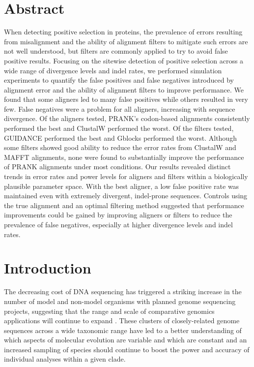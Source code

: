 \documentclass{article}
\begin{document}
\section*{Abstract}
When detecting positive selection in proteins, the prevalence of
errors resulting from misalignment and the ability of alignment
filters to mitigate such errors are not well understood, but filters
are commonly applied to try to avoid false positive results.
% 
Focusing on the sitewise detection of positive selection across a wide
range of divergence levels and indel rates, we performed simulation
experiments to quantify the false positives and false negatives
introduced by alignment error and the ability of alignment filters to
improve performance.
%
We found that some aligners led to many false positives while others
resulted in very few.  False negatives were a problem for all
aligners, increasing with sequence divergence. Of the aligners tested, PRANK's
codon-based alignments consistently performed the best and ClustalW
performed the worst.
%
Of the filters tested, GUIDANCE performed the best and Gblocks
performed the worst. Although some filters showed good ability to
reduce the error rates from ClustalW and MAFFT alignments, none were
found to substantially improve the performance of PRANK alignments
under most conditions.
%
Our results revealed distinct trends in error rates and power levels
for aligners and filters within a biologically plausible parameter
space. With the best aligner, a low false positive rate was maintained
even with extremely divergent, indel-prone sequences. Controls using
the true alignment and an optimal filtering method suggested that
performance improvements could be gained by improving aligners or
filters to reduce the prevalence of false negatives, especially at
higher divergence levels and indel rates.


\section*{Introduction}

The decreasing cost of DNA sequencing has triggered a striking
increase in the number of model and non-model organisms with planned
genome sequencing projects, suggesting that the range and scale of
comparative genomics applications will continue to expand
\citep{Green20072x,2007Identification}. These clusters of
closely-related genome sequences across a wide taxonomic range have
led to a better understanding of which aspects of molecular evolution
are variable and which are constant \citep{Wolf2009Nonlinear} and an
increased sampling of species should continue to boost the power and
accuracy of individual analyses within a given clade.
\end{document}
